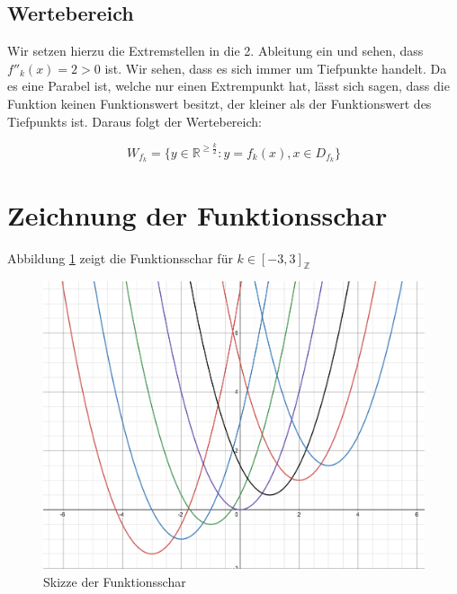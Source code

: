 \documentclass[12pt,a4paper]{article}
\begin{document}
\subsection {Wertebereich}

Wir setzen hierzu die Extremstellen in die 2. Ableitung ein und sehen, dass $f''_k(x) = 2 > 0$ ist. Wir sehen, dass es sich immer um Tiefpunkte handelt. Da es eine Parabel ist, welche nur einen Extrempunkt hat, lässt sich sagen, dass die Funktion keinen Funktionswert besitzt, der kleiner als der Funktionswert des Tiefpunkts ist. Daraus folgt der Wertebereich:

$$
W_{f_k} = \{ y \in \mathbb{R}^{\ge\frac{k}{2}} : y = f_k(x), x \in D_{f_k} \}
$$

\section{Zeichnung der Funktionsschar}

Abbildung \ref{fig:draw} zeigt die Funktionsschar für  $k \in [-3, 3]_{\mathbb{Z}}$

\begin{figure}[h]
    \centering
    \includegraphics[width=1\textwidth]{./images/IMG_1615.jpg}
    \caption{Skizze der Funktionsschar}
    \label{fig:draw}
\end{figure}


\printbibliography[title={Literaturverzeichnis}]
\end{document}
